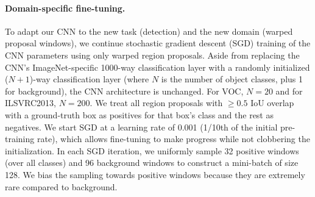 \paragraph{Domain-specific fine-tuning.}
To adapt our CNN to the new task (detection) and the new domain (warped proposal windows), we continue stochastic gradient descent (SGD) training of the CNN parameters using only warped region proposals.
Aside from replacing the CNN's ImageNet-specific 1000-way classification layer with a randomly initialized ($N+1$)-way classification layer (where $N$ is the number of object classes, plus 1 for background), the CNN architecture is unchanged.
For VOC, $N = 20$ and for ILSVRC2013, $N = 200$.
We treat all region proposals with $\geq 0.5$ IoU overlap with a ground-truth
box as positives for that box's class and the rest as negatives. 
We start SGD at a learning rate of 0.001 (1/10th of the initial pre-training rate),
which allows fine-tuning to make progress while not clobbering the initialization.
In each SGD iteration, we uniformly sample 32 positive windows (over all classes) and 96 background windows to construct a mini-batch of size 128.
We bias the sampling towards positive windows because they are extremely rare compared to background.

